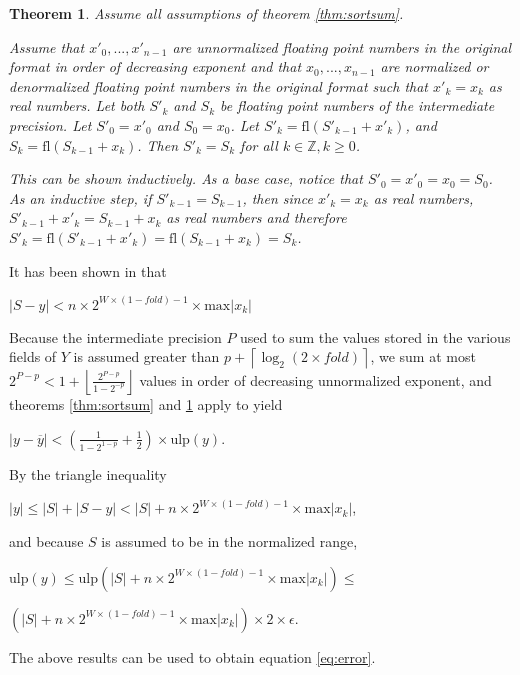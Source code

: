 \documentclass[12pt]{article}
\providecommand{\ceil}[1]{\left \lceil #1 \right \rceil }
\providecommand{\floor}[1]{\left \lfloor #1 \right \rfloor }
\providecommand{\Z}{\ensuremath{\mathbb{Z}}}
\providecommand{\max}{\ensuremath{\text{max}}}
\providecommand{\ulp}{\ensuremath{\text{ulp}}}
\providecommand{\fl}{\ensuremath{\text{fl}}}
\theoremstyle{plain}
\newtheorem{thm}{Theorem}[section]
\begin{document}
    \begin{thm}
      Assume all assumptions of theorem \ref{thm:sortsum}.

      Assume that $x'_0, ..., x'_{n - 1}$ are unnormalized floating point numbers in the original format in order of decreasing exponent and that $x_0, ..., x_{n - 1}$ are normalized or denormalized floating point numbers in the original format such that $x'_k = x_k$ as real numbers.
      Let both $S'_k$ and $S_k$ be floating point numbers of the intermediate precision. Let $S'_0 = x'_0$ and $S_0 = x_0$. Let $S'_k = \fl(S'_{k - 1} + x'_k)$, and $S_k = \fl(S_{k - 1} + x_k)$. Then $S'_k = S_k$ for all $k \in \Z, k \geq 0$.

      This can be shown inductively. As a base case, notice that $S'_0 = x'_0 = x_0 = S_0$. As an inductive step, if $S'_{k - 1} = S_{k - 1}$, then since $x'_k = x_k$ as real numbers, $S'_{k - 1} + x'_k = S_{k - 1} + x_k$ as real numbers and therefore $S'_k = \fl(S'_{k - 1} + x'_k) = \fl(S_{k - 1} + x_k) = S_k$.
      \label{thm:sortsum2}
    \end{thm}

    It has been shown in \cite{repsum} that

    $|S - y| < n \times 2^{W \times (1 - fold) - 1} \times \max|x_k|$

    Because the intermediate precision $P$ used to sum the values stored in the various fields of $Y$ is assumed greater than $p + \ceil{\log_2(2 \times fold)}$, we sum at most $2^{P - p} < 1 + \floor{\frac{2^{P - p}}{1 - 2^{-p}}}$ values in order of decreasing unnormalized exponent, and theorems \ref{thm:sortsum} and \ref{thm:sortsum2} apply to yield

    $|y - \overline{y}| < (\frac{1}{1 - 2^{1 - p}} + \frac{1}{2})\times \ulp(y)$.

    By the triangle inequality

    $|y| \leq |S| + |S - y| < |S| + n \times 2^{W \times (1 - fold) - 1} \times \max|x_k|$,

    and because $S$ is assumed to be in the normalized range,

    $\ulp(y) \leq \ulp(|S| + n \times 2^{W \times (1 - fold) - 1} \times \max|x_k|) \leq $

    \indent \indent$(|S| + n \times 2^{W \times (1 - fold) - 1} \times \max|x_k|) \times 2 \times \epsilon$.

    The above results can be used to obtain equation \ref{eq:error}.
\end{document}
